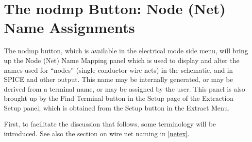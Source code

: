 \section{The {\cb nodmp} Button: Node (Net) Name Assignments}
\label{nodmp}

The {\cb nodmp} button, which is available in the electrical mode side
menu, will bring up the {\cb Node (Net) Name Mapping} panel which is
used to display and alter the names used for ``nodes''
(single-conductor wire nets) in the schematic, and in SPICE and other
output.  This name may be internally generated, or may be derived from
a terminal name, or may be assigned by the user.  This panel is also
brought up by the {\cb Find Terminal} button in the {\cb Setup} page
of the {\cb Extraction Setup} panel, which is obtained from the {\cb
Setup} button in the {\cb Extract Menu}.

First, to facilitate the discussion that follows, some terminology
will be introduced.  See also the section on wire net naming in
\ref{netex}.

